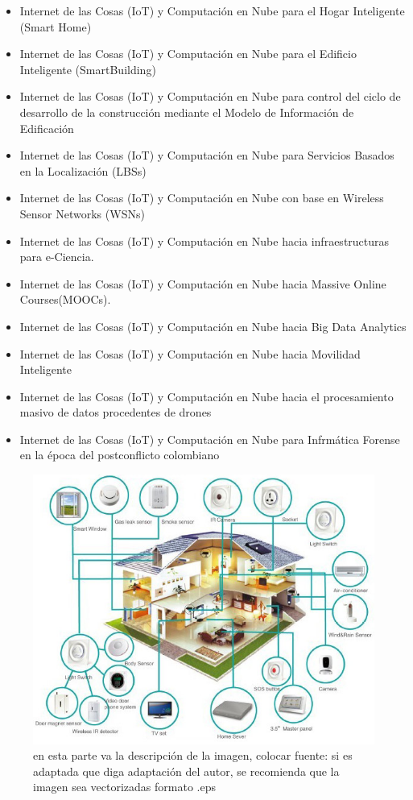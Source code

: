 \documentclass[10pt]{article}   			%
\begin{document}
\begin{itemize}
	\item Internet de las Cosas (IoT) y Computación en Nube para el Hogar Inteligente (Smart Home)
	\item Internet de las Cosas (IoT) y Computación en Nube para el Edificio Inteligente (SmartBuilding)
	\item Internet de las Cosas (IoT) y Computación en Nube para control del ciclo de desarrollo de la construcción mediante el Modelo de Información de Edificación			
	\item Internet de las Cosas (IoT) y Computación en Nube para Servicios Basados en la Localización (LBSs)
	\item Internet de las Cosas (IoT) y Computación en Nube con base en Wireless Sensor Networks (WSNs)
	\item Internet de las Cosas (IoT) y Computación en Nube hacia infraestructuras para e-Ciencia.
	\item Internet de las Cosas (IoT) y Computación en Nube hacia Massive Online Courses(MOOCs).
	\item Internet de las Cosas (IoT) y Computación en Nube hacia Big Data Analytics
	\item Internet de las Cosas (IoT) y Computación en Nube hacia Movilidad Inteligente
	\item Internet de las Cosas (IoT) y Computación en Nube hacia el procesamiento masivo de datos procedentes de drones			
	\item Internet de las Cosas (IoT) y Computación en Nube para Infrmática Forense en la época del postconflicto colombiano			
\end{itemize}
		
\begin{figure}[ht] %
	\centering
		\includegraphics[scale=0.25]{Elementos}   %
	\caption{en esta parte va la descripción de la imagen, colocar fuente: si es adaptada que diga adaptación del autor, se recomienda que la imagen sea vectorizadas formato .eps} \label{fig:Elementos}
\end{figure}
		
\end{document}
